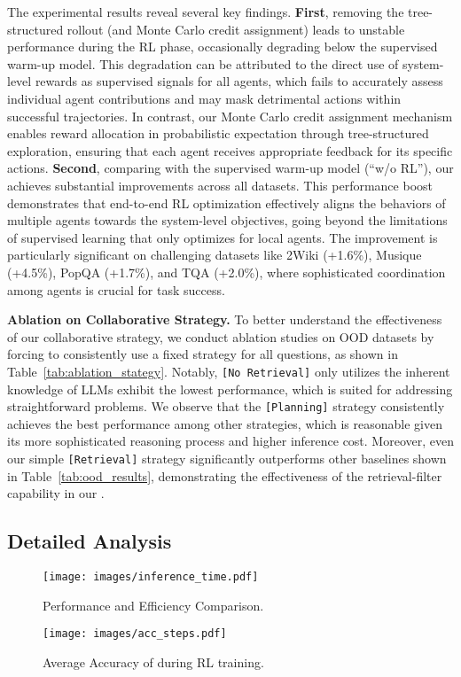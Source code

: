 The experimental results reveal several key findings. 
\textbf{First}, removing the tree-structured rollout (and Monte Carlo credit assignment) leads to unstable performance during the RL phase, occasionally degrading below the supervised warm-up model. 
This degradation can be attributed to the direct use of system-level rewards as supervised signals for all agents, which fails to accurately assess individual agent contributions and may mask detrimental actions within successful trajectories.
In contrast, our Monte Carlo credit assignment mechanism enables reward allocation in probabilistic expectation through tree-structured exploration, ensuring that each agent receives appropriate feedback for its specific actions.
\textbf{Second}, comparing with the supervised warm-up model (``w/o RL''), our \modelname achieves substantial improvements across all datasets.
This performance boost demonstrates that end-to-end RL optimization effectively aligns the behaviors of multiple agents towards the system-level objectives, going beyond the limitations of supervised learning that only optimizes for local agents.
The improvement is particularly significant on challenging datasets like 2Wiki (+1.6\%), Musique (+4.5\%), PopQA (+1.7\%), and TQA (+2.0\%), where sophisticated coordination among agents is crucial for task success.


\textbf{Ablation on Collaborative Strategy.}
To better understand the effectiveness of our collaborative strategy, we conduct ablation studies on OOD datasets by forcing \modelname to consistently use a fixed strategy for all questions, as shown in Table~\ref{tab:ablation_stategy}.
Notably, \texttt{[No Retrieval]} only utilizes the inherent knowledge of LLMs exhibit the lowest performance, which is suited for addressing straightforward problems.
We observe that the \texttt{[Planning]} strategy consistently achieves the best performance among other strategies, which is reasonable given its more sophisticated reasoning process and higher inference cost.
Moreover, even our simple \texttt{[Retrieval]} strategy significantly outperforms other baselines shown in Table~\ref{tab:ood_results}, demonstrating the effectiveness of the retrieval-filter capability in our \modelname.


\subsection{Detailed Analysis}

\begin{figure}[t]
    \centering
    \begin{minipage}{0.48\textwidth}
        \centering
        \texttt{[image: images/inference\_time.pdf]}
        \caption{Performance and Efficiency Comparison.}
        \label{fig:inference_time}
    \end{minipage}
    \hfill
    \begin{minipage}{0.48\textwidth}
        \centering
        \texttt{[image: images/acc\_steps.pdf]}
        \caption{Average Accuracy of \modelname during RL training.}
        \label{fig:acc_steps}
    \end{minipage}
\end{figure}


